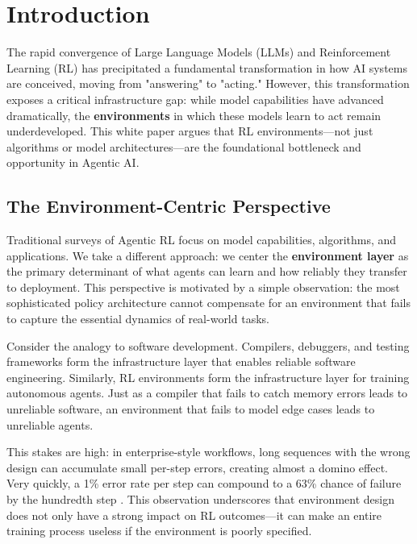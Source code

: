 
\section{Introduction}

The rapid convergence of Large Language Models (LLMs) and Reinforcement Learning (RL) has precipitated a fundamental transformation in how AI systems are conceived, moving from "answering" to "acting." However, this transformation exposes a critical infrastructure gap: while model capabilities have advanced dramatically, the \textbf{environments} in which these models learn to act remain underdeveloped. This white paper argues that RL environments---not just algorithms or model architectures---are the foundational bottleneck and opportunity in Agentic AI.

\subsection{The Environment-Centric Perspective}

Traditional surveys of Agentic RL focus on model capabilities, algorithms, and applications. We take a different approach: we center the \textbf{environment layer} as the primary determinant of what agents can learn and how reliably they transfer to deployment. This perspective is motivated by a simple observation: the most sophisticated policy architecture cannot compensate for an environment that fails to capture the essential dynamics of real-world tasks.

Consider the analogy to software development. Compilers, debuggers, and testing frameworks form the infrastructure layer that enables reliable software engineering. Similarly, RL environments form the infrastructure layer for training autonomous agents. Just as a compiler that fails to catch memory errors leads to unreliable software, an environment that fails to model edge cases leads to unreliable agents.

This stakes are high: in enterprise-style workflows, long sequences with the wrong design can accumulate small per-step errors, creating almost a domino effect. Very quickly, a 1\% error rate per step can compound to a 63\% chance of failure by the hundredth step \citep{nunez2025compounding}. This observation underscores that environment design does not only have a strong impact on RL outcomes—it can make an entire training process useless if the environment is poorly specified.

